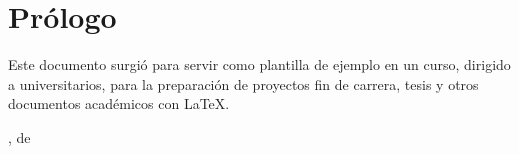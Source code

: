 \chapter*{Prólogo} %

Este documento surgió para servir como plantilla de ejemplo en un curso, dirigido a universitarios, para la preparación de proyectos fin de carrera, tesis y otros documentos académicos con \LaTeX{}.

\begin{flushright}
	\makeatletter
	\@lugarDef, \@mesDef{} de \@yearDef\\[1cm]
	\@autor{}\\
	\@email
	\makeatother
\end{flushright}